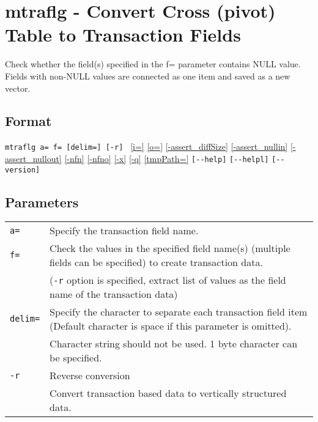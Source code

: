 %
\section{mtraflg - Convert Cross (pivot) Table to Transaction Fields\label{sect:mtraflg}}
Check whether the field(s) specified in the f= parameter contains NULL value. Fields with non-NULL values are connected as one item and saved as a new vector. \\

\subsection*{Format}
\verb|mtraflg a= f= [delim=] [-r] | 
\hyperref[sect:option_i]{[i=]}
\hyperref[sect:option_o]{[o=]}
\hyperref[sect:option_assert_diffSize]{[-assert\_diffSize]}
\hyperref[sect:option_assert_nullin]{[-assert\_nullin]}
\hyperref[sect:option_assert_nullout]{[-assert\_nullout]}
\hyperref[sect:option_nfn]{[-nfn]} 
\hyperref[sect:option_nfno]{[-nfno]}  
\hyperref[sect:option_x]{[-x]}
\hyperref[sect:option_q]{[-q]}
\hyperref[sect:option_option_tmppath]{[tmpPath=]}
\verb|[--help]|
\verb|[--helpl]|
\verb|[--version]|\\

\subsection*{Parameters}
\begin{table}[htbp]
{\small
\begin{tabular}{ll}
\verb|a=|      & Specify the transaction field name.\\
\verb|f=|      & Check the values in the specified field name(s) (multiple fields can be specified)  to create transaction data.\\
               & (\verb|-r| option is specified, extract list of values as the field name of the transaction data)\\
\verb|delim=|  & Specify the character to separate each transaction field item (Default character is space if this parameter is omitted).\\
               & Character string should not be used. 1 byte character can be specified. \\
\verb|-r|      & Reverse conversion\\
               & Convert transaction based data to vertically structured data. \\
\end{tabular} 
}
\end{table} 

